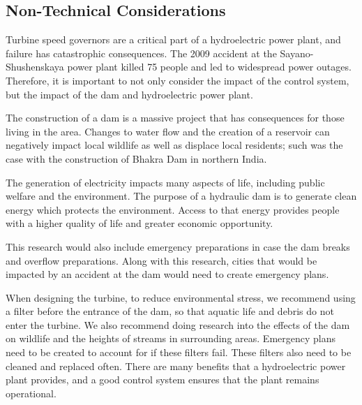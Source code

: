 \documentclass{article}
\begin{document}
        \begin{multicols*}{2}
            
            \section{Non-Technical Considerations}
            
            Turbine speed governors are a critical part of a hydroelectric power plant, and failure has catastrophic consequences. The 2009 accident at the Sayano-Shushenskaya power plant killed 75 people and led to widespread power outages. Therefore, it is important to not only consider the impact of the control system, but the impact of the dam and hydroelectric power plant.
            
            The construction of a dam is a massive project that has consequences for those living in the area. Changes to water flow and the creation of a reservoir can negatively impact local wildlife as well as displace local residents; such was the case with the construction of Bhakra Dam in northern India. 
            
            The generation of electricity impacts many aspects of life, including public welfare and the environment. The purpose of a hydraulic dam is to generate clean energy which protects the environment. Access to that energy provides people with a higher quality of life and greater economic opportunity.
            
            This research would also include emergency preparations in case the dam breaks and overflow preparations. Along with this research, cities that would be impacted by an accident at the dam would need to create emergency plans.
            
            When designing the turbine, to reduce environmental stress, we recommend using a filter before the entrance of the dam, so that aquatic life and debris do not enter the turbine. We also recommend doing research into the effects of the dam on wildlife and the heights of streams in surrounding areas. Emergency plans need to be created to account for if these filters fail. These filters also need to be cleaned and replaced often.
            There are many benefits that a hydroelectric power plant provides, and a good control system ensures that the plant remains operational.
            
        \end{multicols*}
            
            
    \pagebreak
    \nocite{*}
    \printbibliography
\end{document}
